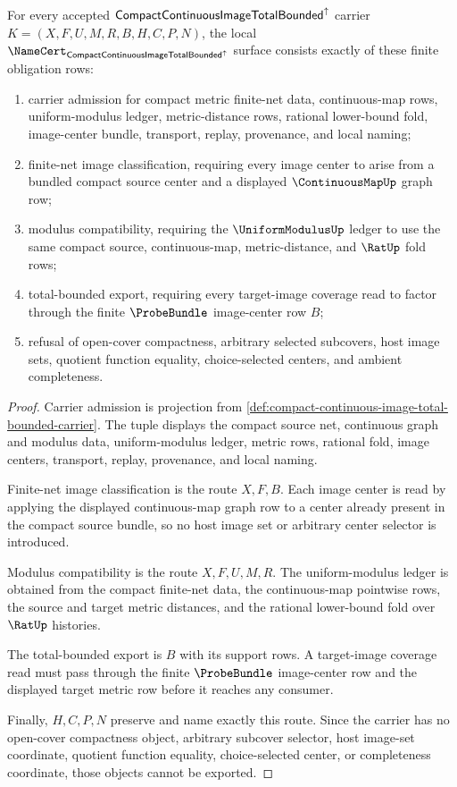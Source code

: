 \begin{theorem}
\label{thm:compact-continuous-image-total-bounded-namecert-obligations}
For every accepted $\mathsf{CompactContinuousImageTotalBounded}^{\uparrow}$ carrier $K=(X,F,U,M,R,B,H,C,P,N)$, the local $\NameCert_{\CompactContinuousImageTotalBoundedUp}$ surface consists exactly of these finite obligation rows:
\begin{enumerate}
\item carrier admission for compact metric finite-net data, continuous-map rows, uniform-modulus ledger, metric-distance rows, rational lower-bound fold, image-center bundle, transport, replay, provenance, and local naming;
\item finite-net image classification, requiring every image center to arise from a bundled compact source center and a displayed $\ContinuousMapUp$ graph row;
\item modulus compatibility, requiring the $\UniformModulusUp$ ledger to use the same compact source, continuous-map, metric-distance, and $\RatUp$ fold rows;
\item total-bounded export, requiring every target-image coverage read to factor through the finite $\ProbeBundle$ image-center row $B$;
\item refusal of open-cover compactness, arbitrary selected subcovers, host image sets, quotient function equality, choice-selected centers, and ambient completeness.
\end{enumerate}
\end{theorem}
\begin{proof}
Carrier admission is projection from \autoref{def:compact-continuous-image-total-bounded-carrier}. The tuple displays the compact source net, continuous graph and modulus data, uniform-modulus ledger, metric rows, rational fold, image centers, transport, replay, provenance, and local naming.

Finite-net image classification is the route $X,F,B$. Each image center is read by applying the displayed continuous-map graph row to a center already present in the compact source bundle, so no host image set or arbitrary center selector is introduced.

Modulus compatibility is the route $X,F,U,M,R$. The uniform-modulus ledger is obtained from the compact finite-net data, the continuous-map pointwise rows, the source and target metric distances, and the rational lower-bound fold over $\RatUp$ histories.

The total-bounded export is $B$ with its support rows. A target-image coverage read must pass through the finite $\ProbeBundle$ image-center row and the displayed target metric row before it reaches any consumer.

Finally, $H,C,P,N$ preserve and name exactly this route. Since the carrier has no open-cover compactness object, arbitrary subcover selector, host image-set coordinate, quotient function equality, choice-selected center, or completeness coordinate, those objects cannot be exported.
\end{proof}

